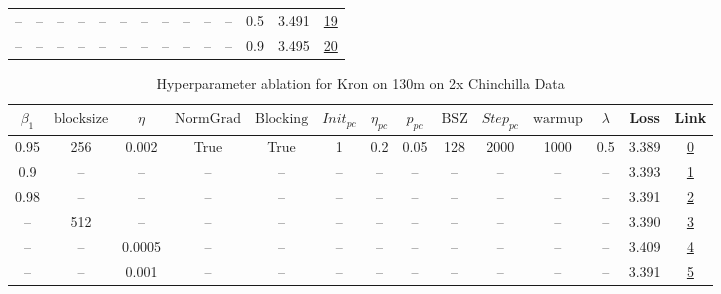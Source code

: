 \begin{table}[H]
\begin{tabular}{cccccccccccccc}
-- & -- & -- & -- & -- & -- & -- & -- & -- & -- & -- & 0.5 & 3.491 & \href{https://wandb.ai/stanford-mercury/optimizer-scaling/runs/sweep-130m-2B-kronf8119alr0.002-wd0.5-b10.95-plr0.2-pis1-gn1-nor-2ef7b8}{19} \\
-- & -- & -- & -- & -- & -- & -- & -- & -- & -- & -- & 0.9 & 3.495 & \href{https://wandb.ai/stanford-mercury/optimizer-scaling/runs/sweep-130m-2B-kron476954lr0.002-wd0.9-b10.95-plr0.2-pis1-gn1-nor-356b60}{20} \\
\bottomrule
\end{tabular}
\end{table}

\begin{table}[H]
\centering
\caption{Hyperparameter ablation for Kron on 130m on 2x Chinchilla Data}
\label{tab:ablation_kron_130m_2}
\begin{tabular}{cccccccccccccc}
\toprule
$\beta_1$ & $\mathrm{block size}$ & $\eta$ & $\mathrm{NormGrad}$ & $\mathrm{Blocking}$ & $Init_{pc}$ & $\eta_{pc}$ & $p_{pc}$ & $\mathrm{BSZ}$ & $Step_{pc}$ & $\mathrm{warmup}$ & $\lambda$ & Loss & Link \\
\midrule
0.95 & 256 & 0.002 & True & True & 1 & 0.2 & 0.05 & 128 & 2000 & 1000 & 0.5 & 3.389 & \href{https://wandb.ai/stanford-mercury/optimizer-scaling/runs/sweep-130m-5B-kron45d4b7lr0.002-wd0.5-b10.95-plr0.2-pis1-gn1-nor-c54de5}{0} \\
\midrule
0.9 & -- & -- & -- & -- & -- & -- & -- & -- & -- & -- & -- & 3.393 & \href{https://wandb.ai/stanford-mercury/optimizer-scaling/runs/sweep-130m-5B-kronc6e4f0lr0.002-wd0.5-b10.9-plr0.2-pis1-gn1-norm-b99f14}{1} \\
0.98 & -- & -- & -- & -- & -- & -- & -- & -- & -- & -- & -- & 3.391 & \href{https://wandb.ai/stanford-mercury/optimizer-scaling/runs/sweep-130m-5B-kron446e3clr0.002-wd0.5-b10.98-plr0.2-pis1-gn1-nor-60f801}{2} \\
-- & 512 & -- & -- & -- & -- & -- & -- & -- & -- & -- & -- & 3.390 & \href{https://wandb.ai/stanford-mercury/optimizer-scaling/runs/sweep-130m-5B-kron47f90elr0.002-wd0.5-b10.95-plr0.2-pis1-gn1-nor-50b12f}{3} \\
-- & -- & 0.0005 & -- & -- & -- & -- & -- & -- & -- & -- & -- & 3.409 & \href{https://wandb.ai/stanford-mercury/optimizer-scaling/runs/sweep-130m-5B-kronc5113alr0.0005-wd0.5-b10.95-plr0.2-pis1-gn1-no-25eea5}{4} \\
-- & -- & 0.001 & -- & -- & -- & -- & -- & -- & -- & -- & -- & 3.391 & \href{https://wandb.ai/stanford-mercury/optimizer-scaling/runs/sweep-130m-5B-kron0d84f8lr0.001-wd0.5-b10.95-plr0.2-pis1-gn1-nor-9cbb80}{5} \\

\end{tabular}
\end{table}
